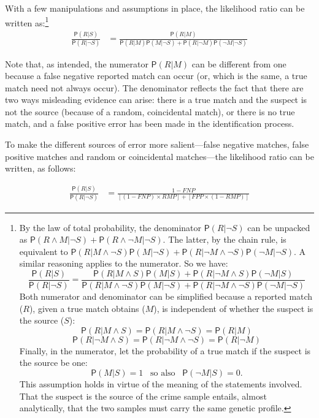 \documentclass[
  10pt,
  dvipsnames,enabledeprecatedfontcommands]{scrartcl}
\newcommand{\n}{\neg}
\newcommand{\et}{\wedge}
\newcommand{\pr}[1]{\mathsf{P}(#1)}
\begin{document}
\noindent With a few manipulations and assumptions in place, the
likelihood ratio can be written as:\footnote{By the law of total
  probability, the denominator \(\pr{R \vert \neg S}\) can be unpacked
  as \(\pr{R \wedge M \vert \neg S} + \pr{R \wedge \neg M | \neg S}\).
  The latter, by the chain rule, is equivalent to
  \(\pr{R \vert M \wedge \neg S}\pr{ M \vert \n S} + \pr{R \vert \n M \wedge \neg S}\pr{\n M \vert \n S}\).
  A similar reasoning applies to the numerator. So we have:
  \[\frac{\pr{R \vert S}}{\pr{R \vert \neg S}} = \frac{\pr{R \vert M \et S}\pr{M \vert S} + \pr{R \vert \n M \et S}\pr{\n M \vert S}} {\pr{R \vert M \et \n S}\pr{M \vert \n S} + \pr{R \vert \n M \et \n S}\pr{\n M \vert \n S}}
  \] Both numerator and denominator can be simplified because a reported
  match (\(R\)), given a true match obtains (\(M\)), is independent of
  whether the suspect is the source (\(S\)):
  \[\pr{R \vert M \et S} = \pr{R \vert M \et \n S} = \pr{R \vert M}\]
  \[\pr{R \vert \n M \et S} = \pr{R \vert\n M \et \n S} = \pr{R \vert \n M}\]
  Finally, in the numerator, let the probability of a true match if the
  suspect is the source be one:
  \[\pr{M\vert S} = 1  \,\,\, \mbox{ so also } \,\,\, \pr{\n M \vert S}=0.\]
  This assumption holds in virtue of the meaning of the statements
  involved. That the suspect is the source of the crime sample entails,
  almost analytically, that the two samples must carry the same genetic
  profile.} \begin{align}
\label{eq:LRfp4}
\frac{\pr{R \vert S}}{\pr{R \vert \neg S}} & = \frac{
\pr{R \vert M}
}{
\pr{R \vert M }\pr{M \vert \n S} +
\pr{R \vert \n M}\pr{\n M \vert \n S}
}
\end{align}

\noindent Note that, as intended, the numerator \(\pr{R \vert M}\) can
be different from one because a false negative reported match can occur
(or, which is the same, a true match need not always occur). The
denominator reflects the fact that there are two ways misleading
evidence can arise: there is a true match and the suspect is not the
source (because of a random, coincidental match), or there is no true
match, and a false positive error has been made in the identification
process.

To make the different sources of error more salient---false negative
matches, false positive matches and random or coincidental matches---the
likelihood ratio can be written, as follows:

\begin{align}
\label{eq:LRfp4b}
\frac{\pr{R \vert S}}{\pr{R \vert \neg S}} & = \frac{1-FNP}{[(1-FNP)\times RMP] + [ FPP \times (1-RMP)]}
\end{align}
\end{document}
